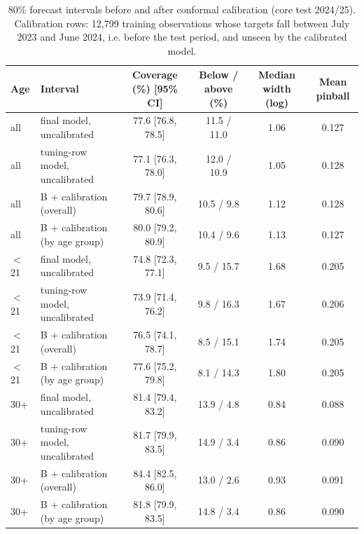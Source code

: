 \begin{table}[!h]
\centering
\caption{80\% forecast intervals before and after conformal calibration (core test 2024/25). Calibration rows: 12{,}799 training observations whose targets fall between July 2023 and June 2024, i.e. before the test period, and unseen by the calibrated model.}
\label{tab:s-calibration}
\footnotesize
\begin{tabular}{llcccc}
\toprule
Age & Interval & Coverage (\%) [95\% CI] & Below / above (\%) & Median width (log) & Mean pinball \\
\midrule
all & final model, uncalibrated & 77.6 [76.8, 78.5] & 11.5 / 11.0 & 1.06 & 0.127 \\
all & tuning-row model, uncalibrated & 77.1 [76.3, 78.0] & 12.0 / 10.9 & 1.05 & 0.128 \\
all & B + calibration (overall) & 79.7 [78.9, 80.6] & 10.5 / 9.8 & 1.12 & 0.128 \\
all & B + calibration (by age group) & 80.0 [79.2, 80.9] & 10.4 / 9.6 & 1.13 & 0.127 \\
\midrule
$<$21 & final model, uncalibrated & 74.8 [72.3, 77.1] & 9.5 / 15.7 & 1.68 & 0.205 \\
$<$21 & tuning-row model, uncalibrated & 73.9 [71.4, 76.2] & 9.8 / 16.3 & 1.67 & 0.206 \\
$<$21 & B + calibration (overall) & 76.5 [74.1, 78.7] & 8.5 / 15.1 & 1.74 & 0.205 \\
$<$21 & B + calibration (by age group) & 77.6 [75.2, 79.8] & 8.1 / 14.3 & 1.80 & 0.205 \\
\midrule
30+ & final model, uncalibrated & 81.4 [79.4, 83.2] & 13.9 / 4.8 & 0.84 & 0.088 \\
30+ & tuning-row model, uncalibrated & 81.7 [79.9, 83.5] & 14.9 / 3.4 & 0.86 & 0.090 \\
30+ & B + calibration (overall) & 84.4 [82.5, 86.0] & 13.0 / 2.6 & 0.93 & 0.091 \\
30+ & B + calibration (by age group) & 81.8 [79.9, 83.5] & 14.8 / 3.4 & 0.86 & 0.090 \\
\bottomrule
\end{tabular}
\end{table}
